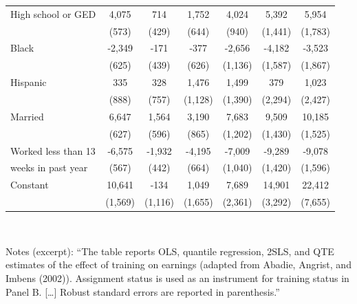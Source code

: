 \documentclass[11pt,a4paper]{article}
\begin{document}
\begin{center}
\begin{tabular}{lcccccc}
High school or GED & 4,075 & 714 & 1,752 & 4,024 & 5,392 & 5,954\\
 & (573) & (429) & (644) & (940) & (1,441) & (1,783)\\
Black & -2,349 & -171 & -377 & -2,656 & -4,182 & -3,523\\
 & (625) & (439) & (626) & (1,136) & (1,587) & (1,867)\\
Hispanic & 335 & 328 & 1,476 & 1,499 & 379 & 1,023\\
 & (888) & (757) & (1,128) & (1,390) & (2,294) & (2,427)\\
Married & 6,647 & 1,564 & 3,190 & 7,683 & 9,509 & 10,185\\
 & (627) & (596) & (865) & (1,202) & (1,430) & (1,525)\\
Worked less than 13 & -6,575 & -1,932 & -4,195 & -7,009 & -9,289 & -9,078\\
weeks in past year & (567) & (442) & (664) & (1,040) & (1,420) & (1,596)\\
Constant & 10,641 & -134 & 1,049 & 7,689 & 14,901 & 22,412\\
 & (1,569) & (1,116) & (1,655) & (2,361) & (3,292) & (7,655)\\
\bottomrule
\end{tabular}\\[2pt]
\parbox{0.92\linewidth}{\footnotesize Notes (excerpt): ``The table reports OLS, quantile regression, 2SLS, and
QTE estimates of the effect of training on earnings (adapted from Abadie, Angrist, and Imbens (2002)).
Assignment status is used as an instrument for training status in Panel B. [\dots] Robust standard errors
are reported in parenthesis.''}
\end{center}
\end{document}
